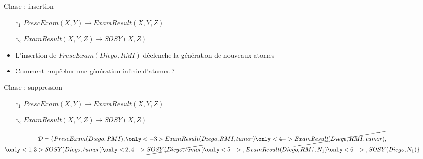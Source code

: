 \begin{frame}{Chase : insertion}
    \begin{itemize}
        \item[$c_1$] $PrescExam(X, Y) \to ExamResult(X, Y, Z)$
        \item[$c_2$] $ExamResult(X, Y, Z) \to SOSY(X, Z)$
    \end{itemize}

    \begin{block}{}
        \begin{itemize}
            \item L'insertion de $PrescExam(Diego, RMI)$ déclenche la génération de nouveaux atomes\\
            \item<only@2-> Comment empêcher une génération infinie d'atomes ? 
        \end{itemize}

    \end{block}

\end{frame}

\begin{frame}{Chase : suppression}
    \begin{itemize}
        \item[$c_1$] $PrescExam(X, Y) \to ExamResult(X, Y, Z)$
        \item[$c_2$] $ExamResult(X, Y, Z) \to SOSY(X, Z)$
    \end{itemize}

    \begin{multline*}
        \mathcal{D} = \{
            PrescExam(Diego, RMI), \only<-3>{ExamResult(Diego, RMI, tumor)}\only<4->{\cancel{ExamResult(Diego, RMI, tumor)}}
            ,\\\only<1,3>{SOSY(Diego, tumor)}\only<2,4->{\cancel{SOSY(Diego, tumor)}}
            \only<5->{, ExamResult(Diego, RMI, N_1)}\only<6->{, SOSY(Diego, N_1)}
        \}
        \end{multline*}
\end{frame}

